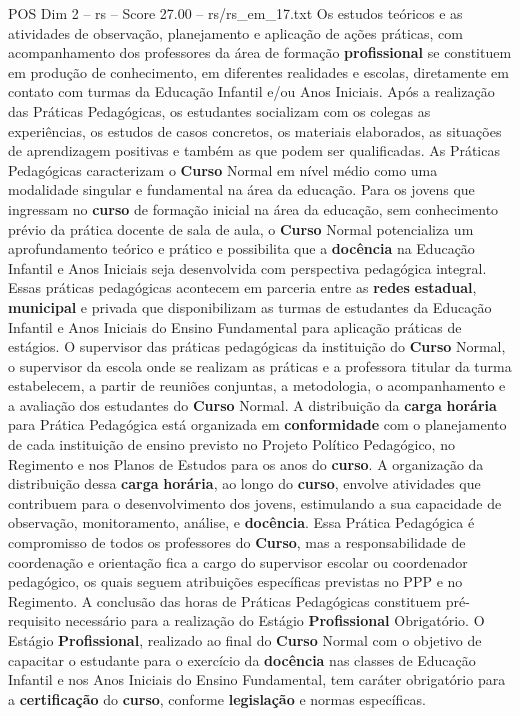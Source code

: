 \begin{textsample}{POS Dim 2 – rs – Score 27.00 – rs/rs\_em\_17.txt}
Os estudos teóricos e as atividades de observação, planejamento e aplicação de ações práticas, com acompanhamento dos professores da área de formação \textbf{profissional} se constituem em produção de conhecimento, em diferentes realidades e escolas, diretamente em contato com turmas da Educação Infantil e/ou Anos Iniciais.
Após a realização das Práticas Pedagógicas, os estudantes socializam com os colegas as experiências, os estudos de casos concretos, os materiais elaborados, as situações de aprendizagem positivas e também as que podem ser qualificadas.
As Práticas Pedagógicas caracterizam o \textbf{Curso} Normal em nível médio como uma modalidade singular e fundamental na área da educação.
Para os jovens que ingressam no \textbf{curso} de formação inicial na área da educação, sem conhecimento prévio da prática docente de sala de aula, o \textbf{Curso} Normal potencializa um aprofundamento teórico e prático e possibilita que a \textbf{docência} na Educação Infantil e Anos Iniciais seja desenvolvida com perspectiva pedagógica integral.
Essas práticas pedagógicas acontecem em parceria entre as \textbf{redes} \textbf{estadual}, \textbf{municipal} e privada que disponibilizam as turmas de estudantes da Educação Infantil e Anos Iniciais do Ensino Fundamental para aplicação práticas de estágios.
O supervisor das práticas pedagógicas da instituição do \textbf{Curso} Normal, o supervisor da escola onde se realizam as práticas e a professora titular da turma estabelecem, a partir de reuniões conjuntas, a metodologia, o acompanhamento e a avaliação dos estudantes do \textbf{Curso} Normal.
A distribuição da \textbf{carga} \textbf{horária} para Prática Pedagógica está organizada em \textbf{conformidade} com o planejamento de cada instituição de ensino previsto no Projeto Político Pedagógico, no Regimento e nos Planos de Estudos para os anos do \textbf{curso}.
A organização da distribuição dessa \textbf{carga} \textbf{horária}, ao longo do \textbf{curso}, envolve atividades que contribuem para o desenvolvimento dos jovens, estimulando a sua capacidade de observação, monitoramento, análise, e \textbf{docência}.
Essa Prática Pedagógica é compromisso de todos os professores do \textbf{Curso}, mas a responsabilidade de coordenação e orientação fica a cargo do supervisor escolar ou coordenador pedagógico, os quais seguem atribuições específicas previstas no PPP e no Regimento.
A conclusão das horas de Práticas Pedagógicas constituem pré-requisito necessário para a realização do Estágio \textbf{Profissional} Obrigatório.
O Estágio \textbf{Profissional}, realizado ao final do \textbf{Curso} Normal com o objetivo de capacitar o estudante para o exercício da \textbf{docência} nas classes de Educação Infantil e nos Anos Iniciais do Ensino Fundamental, tem caráter obrigatório para a \textbf{certificação} do \textbf{curso}, conforme \textbf{legislação} e normas específicas.

\end{textsample}
